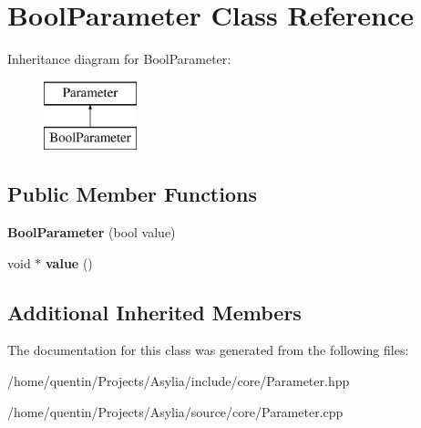 \hypertarget{classBoolParameter}{\section{Bool\-Parameter Class Reference}
\label{classBoolParameter}
}
Inheritance diagram for Bool\-Parameter\-:\begin{figure}[H]
\begin{center}
\leavevmode
\includegraphics[height=2.000000cm]{classBoolParameter}
\end{center}
\end{figure}
\subsection*{Public Member Functions}
\begin{DoxyCompactItemize}
\item 
\hypertarget{classBoolParameter_afbb5ac0ee11213b125682be7a7bde828}{{\bfseries Bool\-Parameter} (bool value)}\label{classBoolParameter_afbb5ac0ee11213b125682be7a7bde828}

\item 
\hypertarget{classBoolParameter_a361e2d9604deb15e620643803106dabb}{void $\ast$ {\bfseries value} ()}\label{classBoolParameter_a361e2d9604deb15e620643803106dabb}

\end{DoxyCompactItemize}
\subsection*{Additional Inherited Members}


The documentation for this class was generated from the following files\-:\begin{DoxyCompactItemize}
\item 
/home/quentin/\-Projects/\-Asylia/include/core/Parameter.\-hpp\item 
/home/quentin/\-Projects/\-Asylia/source/core/Parameter.\-cpp\end{DoxyCompactItemize}
